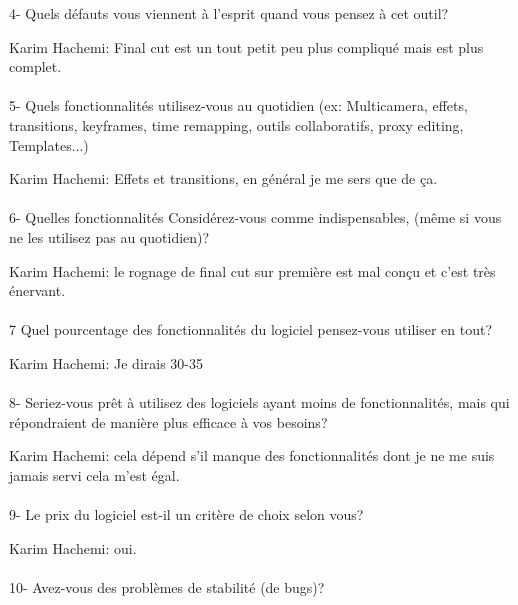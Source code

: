 4- Quels défauts vous viennent à l'esprit quand vous pensez à cet outil?

Karim Hachemi: Final cut est un tout petit peu plus compliqué mais
est plus complet.


\paragraph{}
5-  Quels fonctionnalités utilisez-vous au quotidien (ex: Multicamera, effets,
transitions, keyframes, time remapping, outils collaboratifs, proxy
editing, Templates...)

Karim Hachemi: Effets et transitions, en général je me sers que de ça.

\paragraph{}
6-  Quelles fonctionnalités Considérez-vous comme indispensables, (même si vous
ne les utilisez pas au quotidien)?

Karim Hachemi: le rognage de final cut sur première est mal conçu et c'est très
énervant.

\paragraph{}
7 Quel pourcentage des fonctionnalités du logiciel pensez-vous utiliser
en tout?

Karim Hachemi: Je dirais 30-35%

\paragraph{}
8- Seriez-vous prêt à utilisez des logiciels ayant moins de fonctionnalités,
mais qui répondraient de manière plus efficace à vos besoins?

Karim Hachemi: cela dépend s'il manque des fonctionnalités dont je ne me
suis jamais servi cela m'est égal.

\paragraph{}
9-  Le prix du logiciel est-il un critère de choix selon vous?

Karim Hachemi: oui.

\paragraph{}
10- Avez-vous des problèmes de stabilité (de bugs)?

